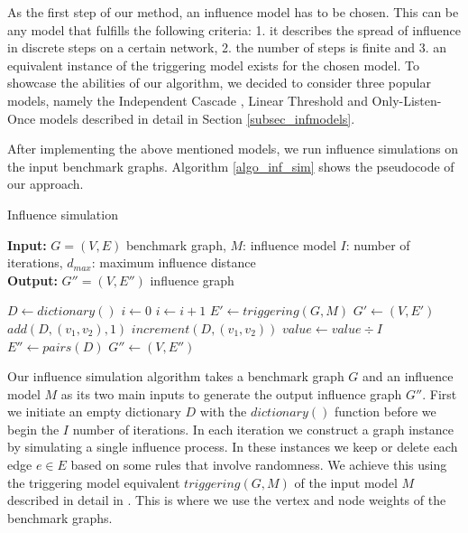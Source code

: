 \documentclass[pdflatex,sn-mathphys-ay]{sn-jnl}
\begin{document}
As the first step of our method, an influence model has to be chosen. This can be any model that fulfills the following criteria: 1. it describes the spread of influence in discrete steps on a certain network, 2. the number of steps is finite and 3. an equivalent instance of the triggering model exists \citep{kempe} for the chosen model. To showcase the abilities of our algorithm, we decided to consider three popular models, namely the Independent Cascade \citep{domingos, kempe}, Linear Threshold \citep{granovetter, kempe} and Only-Listen-Once models \citep{kempe} described in detail in Section \ref{subsec_infmodels}.

After implementing the above mentioned models, we run influence simulations on the input benchmark graphs. Algorithm \ref{algo_inf_sim} shows the pseudocode of our approach.

\begin{algorithm}[ht]
\caption{Influence simulation}
\label{algo_inf_sim}
\textbf{Input:} $G = (V,E)$ benchmark graph, $M$: influence model $I$: number of iterations, $d_{max}$: maximum influence distance
\\
\textbf{Output:} $G'' = (V,E'')$ influence graph
\begin{algorithmic}[1]
    \State $D \gets dictionary()$
    \State $i \gets 0$
        \State $i \gets i + 1$
        \State $E' \gets triggering(G,M)$
        \State $G' \gets (V,E')$
                    \State $add(D,(v_1,v_2),1)$
                \Else
                    \State $increment(D,(v_1,v_2))$
                \EndIf
            \EndIf
        \EndFor
    \EndWhile
        \State $value \gets value \div I$
    \EndFor
    \State $E'' \gets pairs(D)$
    \State $G'' \gets (V,E'')$
\end{algorithmic}
\end{algorithm}

Our influence simulation algorithm takes a benchmark graph $G$ and an influence model $M$ as its two main inputs to generate the output influence graph $G''$. First we initiate an empty dictionary $D$ with the $dictionary()$ function before we begin the $I$ number of iterations. In each iteration we construct a graph instance by simulating a single influence process. In these instances we keep or delete each edge $e \in E$ based on some rules that involve randomness. We achieve this using the triggering model equivalent $triggering(G,M)$ of the input model $M$ described in detail in \citep{kempe}. This is where we use the vertex and node weights of the benchmark graphs.
\end{document}
